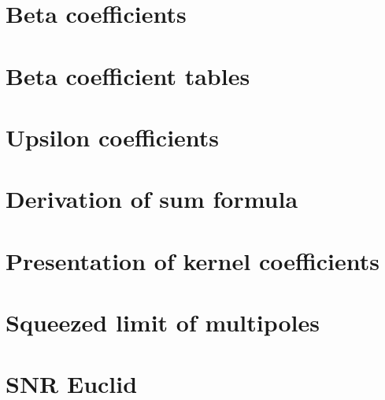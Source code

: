\begin{appendices}
%
\chapter{Beta coefficients}
\label{app_betas}
%

%
\chapter{Beta coefficient tables}
\label{app_pnga}
%

%
\chapter{Upsilon coefficients}
\label{app_pngb}
%

%
\chapter{Derivation of sum formula}
\label{app_sum}
%

%
\chapter{Presentation of kernel coefficients}
\label{app_kernelpres}
%

%
\chapter{Squeezed limit of multipoles}
\label{app_sqlimmultip}
%

%
\chapter{SNR Euclid}
\label{app_euclid}
%

%
\end{appendices}
